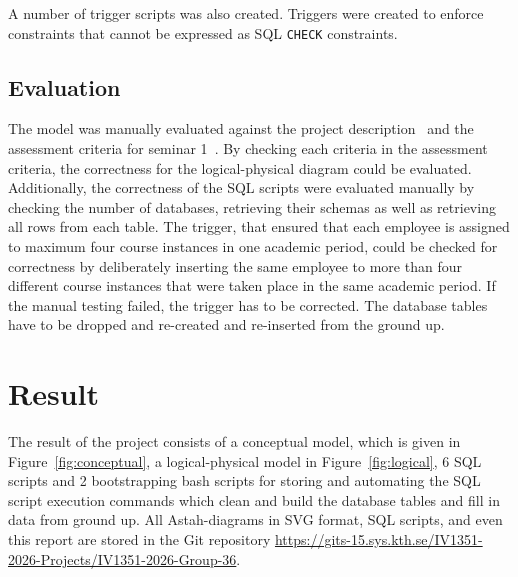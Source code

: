 \documentclass[a4paper]{scrartcl}
\renewcommand{\_}{\textunderscore\allowbreak}
\begin{document}
A number of trigger scripts was also created. Triggers were created to enforce constraints that cannot be expressed as SQL \texttt{CHECK} constraints. 

\subsection{Evaluation}

The model was manually evaluated against the project description~\cite{project} and the assessment criteria for seminar 1~\cite{criteria}. By checking each criteria in the assessment criteria, the correctness for the logical-physical diagram could be evaluated. Additionally, the correctness of the SQL scripts were evaluated manually by checking the number of databases, retrieving their schemas as well as retrieving all rows from each table. The trigger, that ensured that each employee is assigned to maximum four course instances in one academic period, could be checked for correctness by deliberately inserting the same employee to more than four different course instances that were taken place in the same academic period. If the manual testing failed, the trigger has to be corrected. The database tables have to be dropped and re-created and re-inserted from the ground up.

\section{Result}


The result of the project consists of a conceptual model, which is given in Figure~\ref{fig:conceptual}, a logical-physical model in Figure~\ref{fig:logical}, 6 SQL scripts and 2 bootstrapping bash scripts for storing and automating the SQL script execution commands which clean and build the database tables and fill in data from ground up. All Astah-diagrams in SVG format, SQL scripts, and even this report are stored in the Git repository \url{https://gits-15.sys.kth.se/IV1351-2026-Projects/IV1351-2026-Group-36}. %
\end{document}
